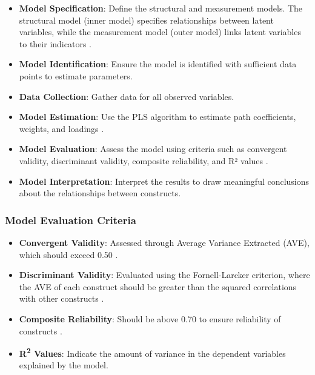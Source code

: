 \begin{itemize}
    \item \textbf{Model Specification}: Define the structural and measurement models. The structural model (inner model) specifies relationships between latent variables, while the measurement model (outer model) links latent variables to their indicators \parencite{Lohmoller1989LatentSquares}.

    \item \textbf{Model Identification}: Ensure the model is identified with sufficient data points to estimate parameters.

    \item \textbf{Data Collection}: Gather data for all observed variables.

    \item \textbf{Model Estimation}: Use the PLS algorithm to estimate path coefficients, weights, and loadings \parencite{Wold1985SystemsSquares}.

    \item \textbf{Model Evaluation}: Assess the model using criteria such as convergent validity, discriminant validity, composite reliability, and R² values \parencite{Tenenhaus2005PLSModeling}.

    \item \textbf{Model Interpretation}: Interpret the results to draw meaningful conclusions about the relationships between constructs.
\end{itemize}

\subsubsection{Model Evaluation Criteria}

\begin{itemize}
    \item \textbf{Convergent Validity}: Assessed through Average Variance Extracted (AVE), which should exceed 0.50 \parencite{Henseler2015AModeling}.

    \item \textbf{Discriminant Validity}: Evaluated using the Fornell-Larcker criterion, where the AVE of each construct should be greater than the squared correlations with other constructs \parencite{Henseler2015AModeling}.

    \item \textbf{Composite Reliability}: Should be above 0.70 to ensure reliability of constructs \parencite{Sarstedt2017PartialModeling}.

    \item \textbf{R\textsuperscript{2} Values}: Indicate the amount of variance in the dependent variables explained by the model.
\end{itemize}

